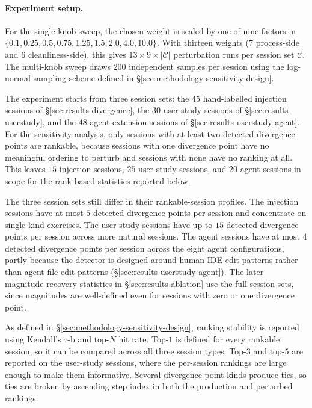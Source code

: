 \paragraph{Experiment setup.}
For the single-knob sweep, the chosen weight is scaled by one of nine factors in $\{0.1, 0.25, 0.5, 0.75, 1.25, 1.5, 2.0, 4.0, 10.0\}$. With thirteen weights ($7$ process-side and $6$ cleanliness-side), this gives $13 \times 9 \times \lvert \mathcal{C} \rvert$ perturbation runs per session set $\mathcal{C}$. The multi-knob sweep draws $200$ independent samples per session using the log-normal sampling scheme defined in \S\ref{sec:methodology-sensitivity-design}.

The experiment starts from three session sets: the $45$ hand-labelled injection sessions of \S\ref{sec:results-divergence}, the $30$ user-study sessions of \S\ref{sec:results-userstudy}, and the $48$ agent extension sessions of \S\ref{sec:results-userstudy-agent}. For the sensitivity analysis, only sessions with at least two detected divergence points are rankable, because sessions with one divergence point have no meaningful ordering to perturb and sessions with none have no ranking at all. This leaves $15$ injection sessions, $25$ user-study sessions, and $20$ agent sessions in scope for the rank-based statistics reported below.

The three session sets still differ in their rankable-session profiles. The injection sessions have at most $5$ detected divergence points per session and concentrate on single-kind exercises. The user-study sessions have up to $15$ detected divergence points per session across more natural sessions. The agent sessions have at most $4$ detected divergence points per session across the eight agent configurations, partly because the detector is designed around human IDE edit patterns rather than agent file-edit patterns (\S\ref{sec:results-userstudy-agent}). The later magnitude-recovery statistics in \S\ref{sec:results-ablation} use the full session sets, since magnitudes are well-defined even for sessions with zero or one divergence point.

As defined in \S\ref{sec:methodology-sensitivity-design}, ranking stability is reported using Kendall's $\tau$-b and top-$N$ hit rate. Top-$1$ is defined for every rankable session, so it can be compared across all three session types. Top-$3$ and top-$5$ are reported on the user-study sessions, where the per-session rankings are large enough to make them informative. Several divergence-point kinds produce ties, so ties are broken by ascending step index in both the production and perturbed rankings.

